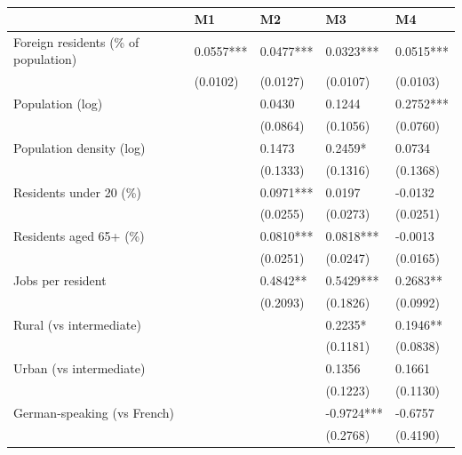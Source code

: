 \begin{table}
\caption{}
\label{}
\begin{center}
\begin{tabular}{lllll}
\hline
                                     & M1        & M2         & M3         & M4         \\
\hline
Foreign residents (\% of population) & 0.0557*** & 0.0477***  & 0.0323***  & 0.0515***  \\
                                     & (0.0102)  & (0.0127)   & (0.0107)   & (0.0103)   \\
Population (log)                     &           & 0.0430     & 0.1244     & 0.2752***  \\
                                     &           & (0.0864)   & (0.1056)   & (0.0760)   \\
Population density (log)             &           & 0.1473     & 0.2459*    & 0.0734     \\
                                     &           & (0.1333)   & (0.1316)   & (0.1368)   \\
Residents under 20 (\%)              &           & 0.0971***  & 0.0197     & -0.0132    \\
                                     &           & (0.0255)   & (0.0273)   & (0.0251)   \\
Residents aged 65+ (\%)              &           & 0.0810***  & 0.0818***  & -0.0013    \\
                                     &           & (0.0251)   & (0.0247)   & (0.0165)   \\
Jobs per resident                    &           & 0.4842**   & 0.5429***  & 0.2683**   \\
                                     &           & (0.2093)   & (0.1826)   & (0.0992)   \\
Rural (vs intermediate)              &           &            & 0.2235*    & 0.1946**   \\
                                     &           &            & (0.1181)   & (0.0838)   \\
Urban (vs intermediate)              &           &            & 0.1356     & 0.1661     \\
                                     &           &            & (0.1223)   & (0.1130)   \\
German-speaking (vs French)          &           &            & -0.9724*** & -0.6757    \\
                                     &           &            & (0.2768)   & (0.4190)   \\

\end{tabular}
\end{center}
\end{table}
